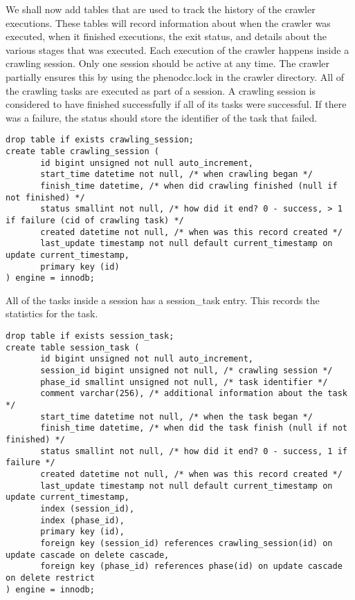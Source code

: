 \documentclass[a4paper,11pt]{article}
\begin{document}
\begin{landscape}
We shall now add tables that are used to track the history of the crawler executions. These tables will record information about when the crawler was executed, when it finished executions, the exit status, and details about the various stages that was executed.
Each execution of the crawler happens inside a crawling session. Only one session should be active at any time. The crawler partially ensures this by using the phenodcc.lock in the crawler directory. All of the crawling tasks are executed as part of a session. A crawling session is considered to have finished successfully if all of its tasks were successful. If there was a failure, the status should store the identifier of the task that failed.

\begin{Verbatim}[fontsize=\small,formatcom=\color{blue}]
drop table if exists crawling_session;
create table crawling_session (
       id bigint unsigned not null auto_increment,
       start_time datetime not null, /* when crawling began */
       finish_time datetime, /* when did crawling finished (null if not finished) */
       status smallint not null, /* how did it end? 0 - success, > 1 if failure (cid of crawling task) */
       created datetime not null, /* when was this record created */
       last_update timestamp not null default current_timestamp on update current_timestamp,
       primary key (id)
) engine = innodb;
\end{Verbatim}

All of the tasks inside a session has a session\_task entry. This records the statistics for the task.

\begin{Verbatim}[fontsize=\small,formatcom=\color{blue}]
drop table if exists session_task;
create table session_task (
       id bigint unsigned not null auto_increment,
       session_id bigint unsigned not null, /* crawling session */
       phase_id smallint unsigned not null, /* task identifier */
       comment varchar(256), /* additional information about the task */
       start_time datetime not null, /* when the task began */
       finish_time datetime, /* when did the task finish (null if not finished) */
       status smallint not null, /* how did it end? 0 - success, 1 if failure */
       created datetime not null, /* when was this record created */
       last_update timestamp not null default current_timestamp on update current_timestamp,
       index (session_id),
       index (phase_id),
       primary key (id),
       foreign key (session_id) references crawling_session(id) on update cascade on delete cascade,
       foreign key (phase_id) references phase(id) on update cascade on delete restrict
) engine = innodb;
\end{Verbatim}

\end{landscape}
\end{document}
